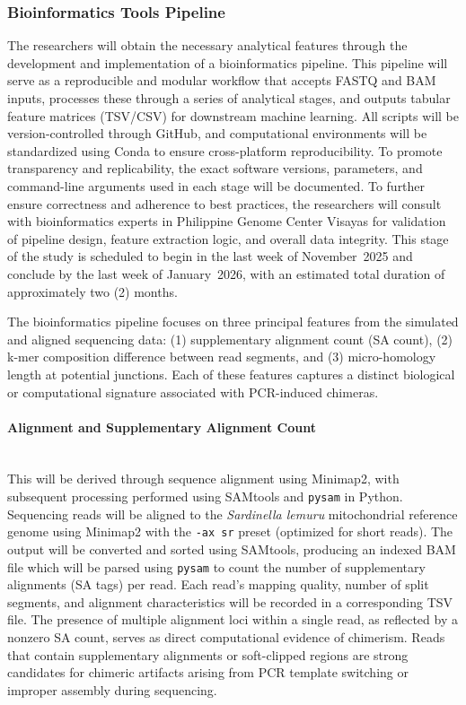 \subsubsection{Bioinformatics Tools Pipeline}

The researchers will obtain the necessary analytical features through the development and implementation of a bioinformatics pipeline. This pipeline will serve as a reproducible and modular workflow that accepts FASTQ and BAM inputs, processes these through a series of analytical stages, and outputs tabular feature matrices (TSV/CSV) for downstream machine learning. All scripts will be version-controlled through GitHub, and computational environments will be standardized using Conda to ensure cross-platform reproducibility. To promote transparency and replicability, the exact software versions, parameters, and command-line arguments used in each stage will be documented. To further ensure correctness and adherence to best practices, the researchers will consult with bioinformatics experts in Philippine Genome Center Visayas for validation of pipeline design, feature extraction logic, and overall data integrity. This stage of the study is scheduled to begin in the last week of November~2025 and conclude by the last week of January~2026, with an estimated total duration of approximately two (2) months.

The bioinformatics pipeline focuses on three principal features from the simulated and aligned sequencing data: (1) supplementary alignment count (SA count), (2) k-mer composition difference between read segments, and (3) micro-homology length at potential junctions. Each of these features captures a distinct biological or computational signature associated with PCR-induced chimeras.

\paragraph{Alignment and Supplementary Alignment Count}\hfill\\
This will be derived through sequence alignment using Minimap2, with subsequent processing performed using SAMtools and \texttt{pysam} in Python. Sequencing reads will be aligned to the \textit{Sardinella lemuru} mitochondrial reference genome using Minimap2 with the \texttt{-ax sr} preset (optimized for short reads). The output will be converted and sorted using SAMtools, producing an indexed BAM file which will be parsed using \texttt{pysam} to count the number of supplementary alignments (SA tags) per read. Each read’s mapping quality, number of split segments, and alignment characteristics will be recorded in a corresponding TSV file. The presence of multiple alignment loci within a single read, as reflected by a nonzero SA count, serves as direct computational evidence of chimerism. Reads that contain supplementary alignments or soft-clipped regions are strong candidates for chimeric artifacts arising from PCR template switching or improper assembly during sequencing.

